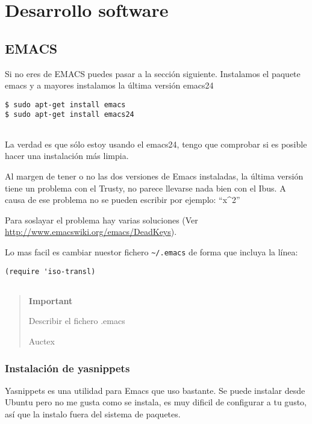 \section{Desarrollo software}\label{desarrollo-software}

\subsection{EMACS}\label{emacs}

Si no eres de EMACS puedes pasar a la sección siguiente. Instalamos el
paquete emacs y a mayores instalamos la última versión emacs24

\begin{verbatim}
$ sudo apt-get install emacs
$ sudo apt-get install emacs24
      
\end{verbatim}

La verdad es que sólo estoy usando el emacs24, tengo que comprobar si es
posible hacer una instalación más limpia.

Al margen de tener o no las dos versiones de Emacs instaladas, la última
versión tiene un problema con el Trusty, no parece llevarse nada bien
con el Ibus. A causa de ese problema no se pueden escribir por ejemplo:
``x\^{}2''

Para soslayar el problema hay varias soluciones (Ver
\url{http://www.emacswiki.org/emacs/DeadKeys}).

Lo mas facil es cambiar nuestor fichero
\texttt{\textasciitilde{}/.emacs} de forma que incluya la línea:

\begin{verbatim}
(require 'iso-transl)
      
\end{verbatim}

\begin{quote}
\textbf{Important}

Describir el fichero .emacs

Auctex
\end{quote}

\subsubsection{Instalación de
yasnippets}\label{instalaciuxf3n-de-yasnippets}

Yasnippets es una utilidad para Emacs que uso bastante. Se puede
instalar desde Ubuntu pero no me gusta como se instala, es muy dificil
de configurar a tu gusto, así que la instalo fuera del sistema de
paquetes.

